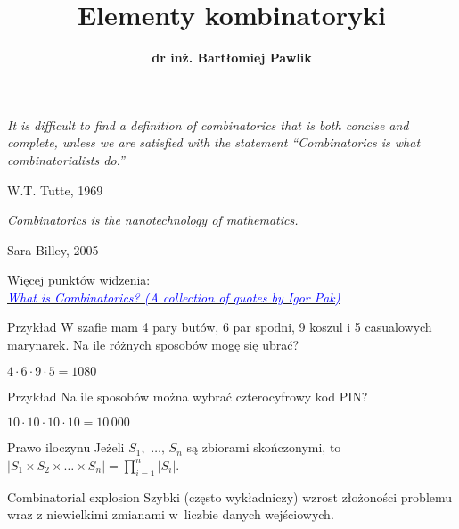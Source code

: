 \documentclass[a4paper,10pt]{beamer}
\title{\bf Elementy kombinatoryki}
\author[B. Pawlik]{\bf dr inż. Bartłomiej Pawlik}
\begin{document}
\begin{frame}
\titlepage
\end{frame}



\begin{frame}
	
	\begin{block}{}
		
		\begin{center}{\it It is difficult to find a definition of combinatorics that is both concise and complete, unless we are satisfied with the statement “Combinatorics is what combinatorialists do.”}\end{center}
		\hfill W.T. Tutte, 1969	
		\vspace{0.5cm}
		\begin{center}{\it Combinatorics is the nanotechnology of mathematics.}\end{center}
		\hfill Sara Billey, 2005	
	\end{block}
\vfill
Więcej punktów widzenia:\\\href{https://www.math.ucla.edu/~pak/hidden/papers/Quotes/Combinatorics-quotes.htm}{\textcolor{blue}{\it What is Combinatorics? (A collection of quotes by Igor Pak)}}

	
\end{frame}



\begin{frame}
	
\begin{exampleblock}{Przykład}
	W szafie mam 4 pary butów, 6 par spodni, 9 koszul i 5 casualowych marynarek. Na ile różnych sposobów mogę się ubrać?
	
	\vspace{0.3cm}
	$4\cdot6\cdot9\cdot5=1080$
\end{exampleblock}

\begin{exampleblock}{Przykład}
	Na ile sposobów można  wybrać czterocyfrowy kod PIN?
	
	\vspace{0.3cm}
	$10\cdot10\cdot10\cdot10=10\,000$
\end{exampleblock}

\begin{block}{Prawo iloczynu}
Jeżeli $S_1,\,\,\ldots,\,S_n$ są zbiorami skończonymi, to $\displaystyle|S_1\times S_2\times\ldots\times S_n|=\prod_{i=1}^n|S_i|$.
\end{block}

\begin{block}{Combinatorial explosion}
Szybki (często wykładniczy) wzrost złożoności problemu wraz z niewielkimi zmianami w~liczbie danych wejściowych. 
\end{block}


\end{frame}
\end{document}
